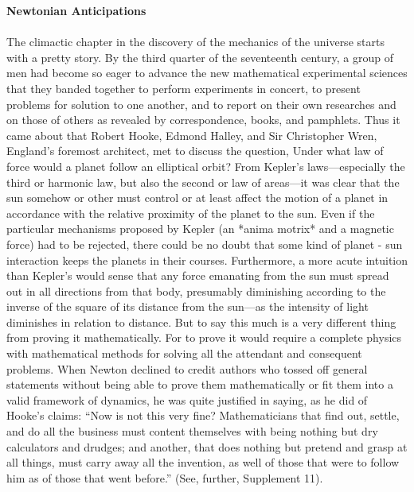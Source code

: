 \documentclass{article}
\begin{document}
\noindent\textbf{Newtonian Anticipations}\\
\\
The climactic chapter in the discovery of the mechanics of the universe starts with a pretty story. By the third quarter of the seventeenth century, a group of men had become so eager to advance the new mathematical experimental sciences that they banded together to perform experiments in concert, to present problems for solution to one another, and to report on their own researches and on those of others as revealed by correspondence, books, and pamphlets. Thus it came about that Robert Hooke, Edmond Halley, and Sir Christopher Wren, England’s foremost architect, met to discuss the question, Under what law of force would a planet follow an elliptical orbit? From Kepler’s laws—especially the third or harmonic law, but also the second or law of areas—it was clear that the sun somehow or other must control or at least affect the motion of a planet in accordance with the relative proximity of the planet to the sun. Even if the particular mechanisms proposed by Kepler (an *anima motrix* and a magnetic force) had to be rejected, there could be no doubt that some kind of planet - sun interaction keeps the planets in their courses. Furthermore, a more acute intuition than Kepler’s would sense that any force emanating from the sun must spread out in all directions from that body, presumably diminishing according to the inverse of the square of its distance from the sun—as the intensity of light diminishes in relation to distance. But to say this much is a very different thing from proving it mathematically. For to prove it would require a complete physics with mathematical methods for solving all the attendant and consequent problems. When Newton declined to credit authors who tossed off general statements without being able to prove them mathematically or fit them into a valid framework of dynamics, he was quite justified in saying, as he did of Hooke’s claims: “Now is not this very fine? Mathematicians that find out, settle, and do all the business must content themselves with being nothing but dry calculators and drudges; and another, that does nothing but pretend and grasp at all things, must carry away all the invention, as well of those that were to follow him as of those that went before.” (See, further, Supplement 11).\\
\end{document}
